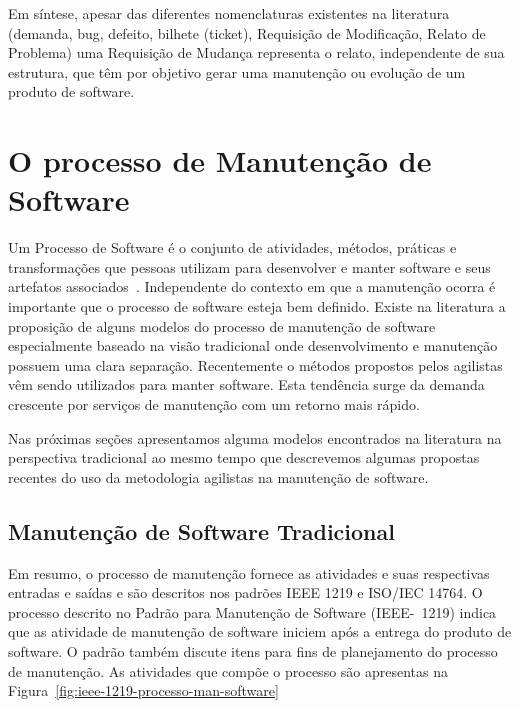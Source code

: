Em síntese, apesar das diferentes nomenclaturas existentes na literatura (demanda, bug, defeito, bilhete (ticket),
Requisição de Modificação, Relato de Problema) uma Requisição de Mudança representa o relato,
independente de sua estrutura, que têm por objetivo gerar uma manutenção ou evolução de um produto
de software. 
 
 \section{O processo de Manutenção de Software}
\label{sec:o_processo_de_manutecao_de_software}

Um Processo de Software é o conjunto de atividades, métodos, práticas e
transformações que pessoas utilizam para desenvolver e manter software e seus
artefatos associados~\cite{paulk1993key}.  Independente do contexto em que a
manutenção ocorra é importante que o processo de software esteja
bem definido. Existe na literatura a proposição de alguns modelos do processo de manutenção de
software especialmente baseado na visão tradicional onde desenvolvimento e manutenção possuem uma
clara separação. Recentemente o métodos propostos pelos agilistas vêm sendo utilizados para manter
software. Esta tendência surge da demanda crescente por serviços de manutenção com um retorno mais
rápido. 

Nas próximas seções apresentamos alguma modelos encontrados na literatura na perspectiva
tradicional ao mesmo tempo que descrevemos algumas propostas recentes  do uso da metodologia
agilistas na manutenção de software. 

\subsection{Manutenção de Software Tradicional}
\label{subsec:manutenção_de_software_tradicional}

Em resumo, o processo de manutenção fornece as atividades e suas respectivas entradas e saídas e são
descritos nos padrões IEEE 1219 e ISO/IEC 14764.  O processo descrito no Padrão para Manutenção de
Software (IEEE-~1219) indica que as atividade de manutenção de software iniciem após a entrega do
produto de software. O padrão também discute itens para fins de planejamento do processo de
manutenção. As atividades que compõe o processo são apresentas na Figura~\ref{fig:ieee-1219-processo-man-software}

